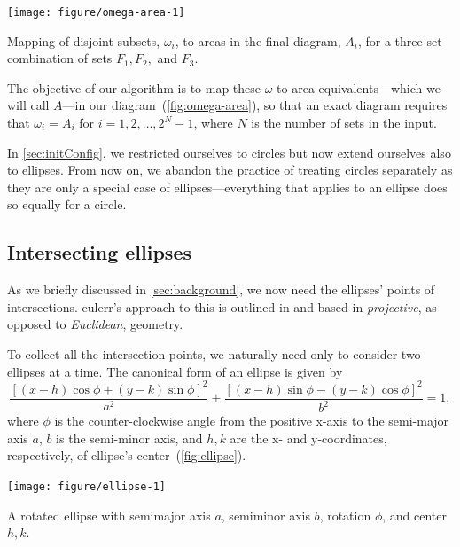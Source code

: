 \documentclass[
  oneside,
  openany,
  numbers=noendperiod,
  parskip=half,
  bibliography=totoc
]{scrbook}\usepackage[]{graphicx}\usepackage{xcolor}
\newenvironment{knitrout}{}{} %
\newcommand{\pkg}[1]{{\fontseries{b}\selectfont #1}}
\begin{document}
\begin{marginfigure}
\begin{knitrout}\small
{}\color{fgcolor}

{\centering \texttt{[image: figure/omega-area-1]} 

}



\end{knitrout}
\caption{Mapping of disjoint subsets, $\omega_i$, to areas in the final
diagram, $A_i$, for a three set combination of sets $F_1,F_2,$ and $F_3$.}
\label{fig:omega-area}
\end{marginfigure}

The objective of our algorithm is to map these $\omega$ to area-equivalents---which
we will call $A$---in our diagram~(\cref{fig:omega-area}), so that
an exact diagram requires that $\omega_i = A_i$ for $i=1,2,\dots,2^N-1$,
where $N$ is the number of sets in the input.

In \cref{sec:initConfig}, we restricted
ourselves to circles but now extend ourselves also to ellipses. From now on,
we abandon the practice of treating circles separately as they are only
a special case of ellipses---everything that applies to an ellipse does so
equally for a circle.

\subsection{Intersecting ellipses}
\label{sec:intersecting-ellipses}

As we briefly discussed in \cref{sec:background}, we now need the ellipses'
points of intersections. \pkg{eulerr}'s approach to this is outlined in
\citet{Richter-Gebert_2011} and based in \emph{projective}, as opposed to
\emph{Euclidean}, geometry.

To collect all the intersection points, we naturally need only to consider two
ellipses at a time. The canonical form of an ellipse is given by
\begin{equation*}
\frac{\left[ (x-h)\cos{\phi}+(y-k)\sin{\phi} \right]^2}{a^2}+
  \frac{\left[(x-h) \sin{\phi}-(y-k) \cos{\phi}\right]^2}{b^2} = 1,
\end{equation*}
where $\phi$ is the counter-clockwise angle from the positive x-axis to the
semi-major axis $a$, $b$ is the semi-minor axis, and $h, k$ are the x- and
y-coordinates, respectively, of ellipse's center~(\cref{fig:ellipse}).

\begin{marginfigure}
\begin{knitrout}\small
{}\color{fgcolor}

{\centering \texttt{[image: figure/ellipse-1]} 

}



\end{knitrout}
\caption{A rotated ellipse with semimajor axis $a$, semiminor axis $b$, rotation $\phi$, and center $h,k$.\label{fig:ellipse}}
\end{marginfigure}
\end{document}
